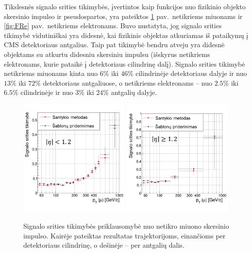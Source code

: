 \documentclass[a4paper, 12pt, oneside]{article}
\begin{document}
Tikslesnės signalo srities tikimybės, įvertintos kaip funkcijos nuo fizikinio objekto skersinio impulso ir pseudospartos,
yra pateiktos \ref{fig:FRmu} pav.\ netikriems miuonams ir \ref{fig:FRe} pav.\ netikriems elektronams.
Buvo nustatyta, jog signalo srities tikimybė vidutiniškai yra didesnė, kai fizikinis objektas atkuriamas iš pataikymų į
CMS detektoriaus antgalius.
Taip pat tikimybė bendru atveju yra didesnė objektams su atkurtu didesniu skersiniu impulsu (išskyrus netikriems elektronams,
kurie pataikė į detektoriaus cilindrinę dalį).
Signalo srities tikimybė netikriems miuonams kinta nuo $6\%$ iki $46\%$ cilindrinėje detektoriaus dalyje ir nuo $13\%$ iki
$72\%$ detektoriaus antgaliuose, o netikriems elektronams -- nuo $2.5\%$ iki $6.5\%$ cilindrinėje ir nuo $3\%$ iki $24\%$ antgalių dalyje.

\begin{figure}[t!]
	\RawFloats
	\includegraphics[width=0.49\textwidth]{Magistrinis/FRmu_barrel.png}
	\includegraphics[width=0.49\textwidth]{Magistrinis/FRmu_endcap.png}
	\caption{\label{fig:FRmu}
		Signalo srities tikimybės priklausomybė nuo netikro miuono skersinio impulso.
		Kairėje pateiktas rezultatas trajektorijoms, einančioms per detektoriaus cilindrinę, o dešinėje -- per antgalių dalis.
}
\end{figure}
\end{document}
